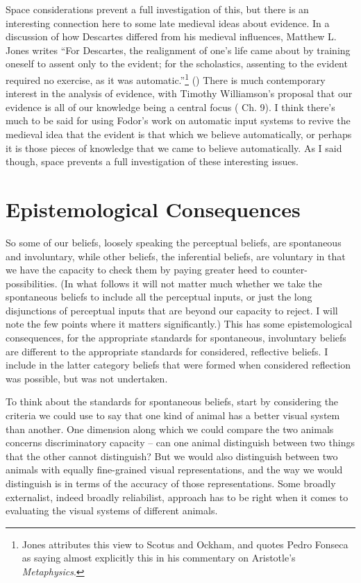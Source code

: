 \documentclass[
  11pt,
  letterpaper,
  DIV=11,
  numbers=noendperiod,
  twoside]{scrartcl}
\begin{document}
Space considerations prevent a full investigation of this, but there is
an interesting connection here to some late medieval ideas about
evidence. In a discussion of how Descartes differed from his medieval
influences, Matthew L. Jones writes ``For Descartes, the realignment of
one's life came about by training oneself to assent only to the evident;
for the scholastics, assenting to the evident required no exercise, as
it was automatic.''\footnote{Jones attributes this view to Scotus and
  Ockham, and quotes Pedro Fonseca as saying almost explicitly this in
  his commentary on Aristotle's \emph{Metaphysics}.}
() There is much contemporary
interest in the analysis of evidence, with Timothy Williamson's proposal
that our evidence is all of our knowledge being a central focus
( Ch. 9). I think
there's much to be said for using Fodor's work on automatic input
systems to revive the medieval idea that the evident is that which we
believe automatically, or perhaps it is those pieces of knowledge that
we came to believe automatically. As I said though, space prevents a
full investigation of these interesting issues.

\section{Epistemological
Consequences}\label{epistemological-consequences}

So some of our beliefs, loosely speaking the perceptual beliefs, are
spontaneous and involuntary, while other beliefs, the inferential
beliefs, are voluntary in that we have the capacity to check them by
paying greater heed to counter-possibilities. (In what follows it will
not matter much whether we take the spontaneous beliefs to include all
the perceptual inputs, or just the long disjunctions of perceptual
inputs that are beyond our capacity to reject. I will note the few
points where it matters significantly.) This has some epistemological
consequences, for the appropriate standards for spontaneous, involuntary
beliefs are different to the appropriate standards for considered,
reflective beliefs. I include in the latter category beliefs that were
formed when considered reflection was possible, but was not undertaken.

To think about the standards for spontaneous beliefs, start by
considering the criteria we could use to say that one kind of animal has
a better visual system than another. One dimension along which we could
compare the two animals concerns discriminatory capacity -- can one
animal distinguish between two things that the other cannot distinguish?
But we would also distinguish between two animals with equally
fine-grained visual representations, and the way we would distinguish is
in terms of the accuracy of those representations. Some broadly
externalist, indeed broadly reliabilist, approach has to be right when
it comes to evaluating the visual systems of different animals.
\end{document}
